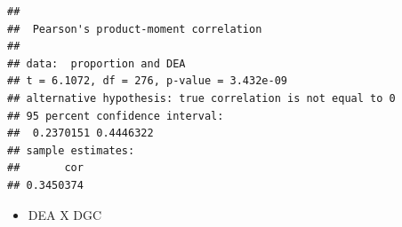 \documentclass[]{article}
\newenvironment{Shaded}{\begin{snugshade}}{\end{snugshade}}
\newcommand{\KeywordTok}[1]{\textcolor[rgb]{0.13,0.29,0.53}{\textbf{#1}}}
\newcommand{\DataTypeTok}[1]{\textcolor[rgb]{0.13,0.29,0.53}{#1}}
\newcommand{\StringTok}[1]{\textcolor[rgb]{0.31,0.60,0.02}{#1}}
\newcommand{\OperatorTok}[1]{\textcolor[rgb]{0.81,0.36,0.00}{\textbf{#1}}}
\newcommand{\NormalTok}[1]{#1}
\providecommand{\tightlist}{%
  \setlength{\itemsep}{0pt}\setlength{\parskip}{0pt}}
\begin{document}
\begin{Shaded}
\end{Shaded}

\begin{verbatim}
## 
##  Pearson's product-moment correlation
## 
## data:  proportion and DEA
## t = 6.1072, df = 276, p-value = 3.432e-09
## alternative hypothesis: true correlation is not equal to 0
## 95 percent confidence interval:
##  0.2370151 0.4446322
## sample estimates:
##       cor 
## 0.3450374
\end{verbatim}

\begin{itemize}
\tightlist
\item
  DEA X DGC
\end{itemize}
\end{document}
